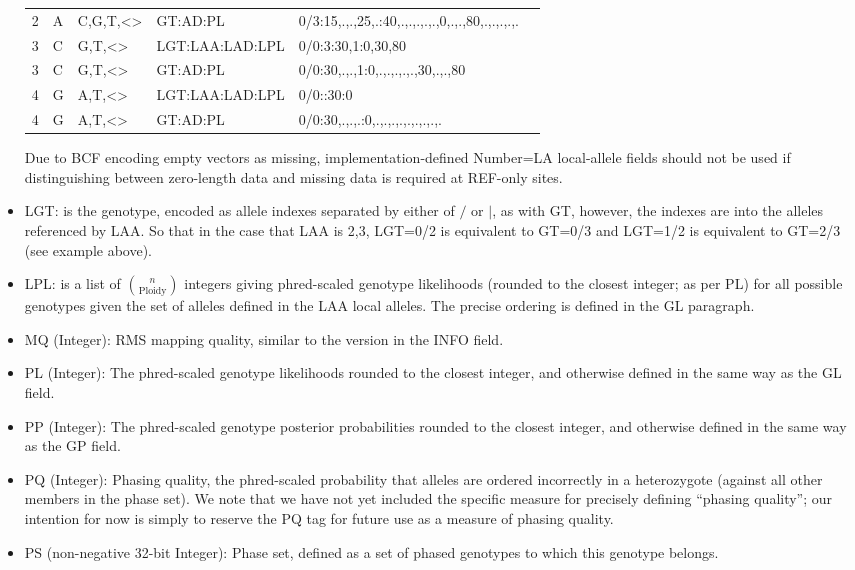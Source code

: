 \documentclass[8pt]{article}
\begin{document}
\begin{itemize}
\begin{tabular}[l]{llllll}
  	2&A&C,G,T,\textless*\textgreater& GT:AD:PL&0/3:15,.,.,25,.:40,.,.,.,.,.,0,.,.,80,.,.,.,.,.\\
  	3&C&G,T,\textless*\textgreater& LGT:LAA:LAD:LPL& 0/0:3:30,1:0,30,80\\
  	3&C&G,T,\textless*\textgreater& GT:AD:PL& 0/0:30,.,.,1:0,.,.,.,.,.,30,.,.,80\\
  	4&G&A,T,\textless*\textgreater& LGT:LAA:LAD:LPL& 0/0::30:0\\
  	4&G&A,T,\textless*\textgreater& GT:AD:PL& 0/0:30,.,.,.:0,.,.,.,.,.,.,.,.,.\\
  \end{tabular}
  Due to BCF encoding empty vectors as missing, implementation-defined Number=LA local-allele fields should not be used if distinguishing between zero-length data and missing data is required at REF-only sites.
  \item LGT: is the genotype, encoded as allele indexes separated by either of $/$ or $\mid$, as with GT, however, the indexes are into the alleles referenced by LAA.
  So that in the case that LAA is 2,3, LGT=0/2 is equivalent to GT=0/3 and LGT=1/2 is equivalent to GT=2/3 (see example above).
  \item LPL: is a list of $n \choose \mathrm{Ploidy}$ integers giving phred-scaled genotype likelihoods (rounded to the closest integer; as per PL) for all possible genotypes given the set of alleles defined in the LAA local alleles.
  The precise ordering is defined in the GL paragraph.
  \item MQ (Integer): RMS mapping quality, similar to the version in the INFO field.
  \item PL (Integer): The phred-scaled genotype likelihoods rounded to the closest integer, and otherwise defined in the same way as the GL field.
  \item PP (Integer): The phred-scaled genotype posterior probabilities rounded to the closest integer, and otherwise defined in the same way as the GP field.
  \item PQ (Integer): Phasing quality, the phred-scaled probability that alleles are ordered incorrectly in a heterozygote (against all other members in the phase set).
  We note that we have not yet included the specific measure for precisely defining ``phasing quality''; our intention for now is simply to reserve the PQ tag for future use as a measure of phasing quality.
  \item PS (non-negative 32-bit Integer): Phase set, defined as a set of phased genotypes to which this genotype belongs.

\end{itemize}
\end{document}
